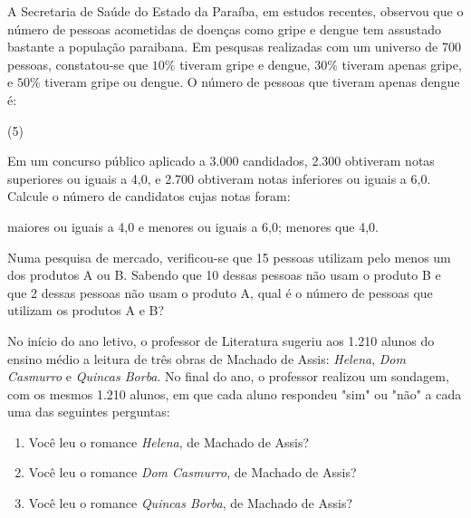 \documentclass[10pt,a4paper]{article}
\begin{document}
\begin{multicols}{2}
    \begin{question}[type=exam]
      A Secretaria de Saúde do Estado da Paraíba, em estudos recentes, observou que o número de pessoas acometidas de 
      doenças como gripe e dengue tem assustado bastante a população paraibana. Em pesqusas realizadas com um universo
      de 700 pessoas, constatou-se que $10\%$ tiveram gripe e dengue, $30\%$ tiveram apenas gripe, e $50\%$ tiveram gripe 
      ou dengue. O número de pessoas que tiveram apenas dengue é:
      
      \begin{tasks}(5)
      \end{tasks}

    \end{question}

    \begin{question}[type=exam]
      Em um concurso público aplicado a 3.000 candidados, 2.300 obtiveram notas superiores ou iguais a 4,0, e 2.700 obtiveram 
      notas inferiores ou iguais a 6,0. Calcule o número de candidatos cujas notas foram:
      \begin{tasks}
        \task maiores ou iguais a 4,0 e menores ou iguais a 6,0;
        \task menores que 4,0.
      \end{tasks}
    \end{question}

    \begin{question}[type=exam]
      Numa pesquisa de mercado, verificou-se que 15 pessoas utilizam pelo menos um dos produtos A ou B. Sabendo que 10 dessas 
      pessoas não usam o produto B e que 2 dessas pessoas não usam o produto A, qual é o número de pessoas que utilizam os produtos
      A e B?
    \end{question}

    \begin{question}[type=exam]
      No início do ano letivo, o professor de Literatura sugeriu aos 1.210 alunos do ensino médio a leitura de três obras de Machado de Assis:
      \textit{Helena}, \textit{Dom Casmurro} e \textit{Quincas Borba}. No final do ano, o professor realizou um sondagem, com os mesmos 1.210 
      alunos, em que cada aluno respondeu "sim" ou "não" a cada uma das seguintes perguntas:

      \begin{enumerate}[label=\Roman*.]
        \item Você leu o romance \textit{Helena}, de Machado de Assis?
        \item Você leu o romance \textit{Dom Casmurro}, de Machado de Assis?
        \item Você leu o romance \textit{Quincas Borba}, de Machado de Assis?
      \end{enumerate}


\end{question}
\end{multicols}
\end{document}
